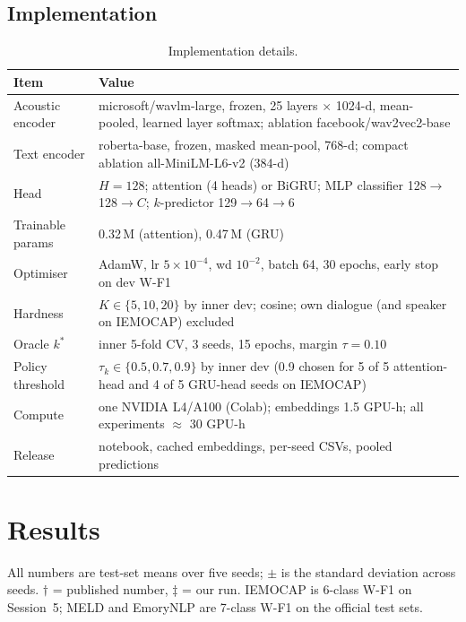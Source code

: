 \documentclass[journal]{IEEEtran}
\newcommand{\wf}{W-F1}
\begin{document}
\subsection{Implementation}
\begin{table}[t]\centering\small
\caption{Implementation details.}\label{tab:impl}
\begin{tabular}{p{2.3cm}p{5.6cm}}\toprule
Item & Value \\ \midrule
Acoustic encoder & microsoft/wavlm-large, frozen, 25 layers $\times$ 1024-d, mean-pooled, learned layer softmax; ablation facebook/wav2vec2-base \\
Text encoder & roberta-base, frozen, masked mean-pool, 768-d; compact ablation all-MiniLM-L6-v2 (384-d) \\
Head & $H = 128$; attention (4 heads) or BiGRU; MLP classifier 128$\rightarrow$128$\rightarrow C$; $k$-predictor 129$\rightarrow$64$\rightarrow$6 \\
Trainable params & 0.32\,M (attention), 0.47\,M (GRU) \\
Optimiser & AdamW, lr $5\times10^{-4}$, wd $10^{-2}$, batch 64, 30 epochs, early stop on dev \wf \\
Hardness & $K \in \{5,10,20\}$ by inner dev; cosine; own dialogue (and speaker on IEMOCAP) excluded \\
Oracle $k^*$ & inner 5-fold CV, 3 seeds, 15 epochs, margin $\tau = 0.10$ \\
Policy threshold & $\tau_k \in \{0.5, 0.7, 0.9\}$ by inner dev (0.9 chosen for 5 of 5 attention-head and 4 of 5 GRU-head seeds on IEMOCAP) \\
Compute & one NVIDIA L4/A100 (Colab); embeddings 1.5 GPU-h; all experiments $\approx$ 30 GPU-h \\
Release & notebook, cached embeddings, per-seed CSVs, pooled predictions \\ \bottomrule
\end{tabular}
\end{table}

\section{Results}\label{sec:results}
All numbers are test-set means over five seeds; $\pm$ is the standard deviation across seeds. $\dagger$ = published number, $\ddagger$ = our run. IEMOCAP is 6-class \wf{} on Session~5; MELD and EmoryNLP are 7-class \wf{} on the official test sets.
\end{document}
